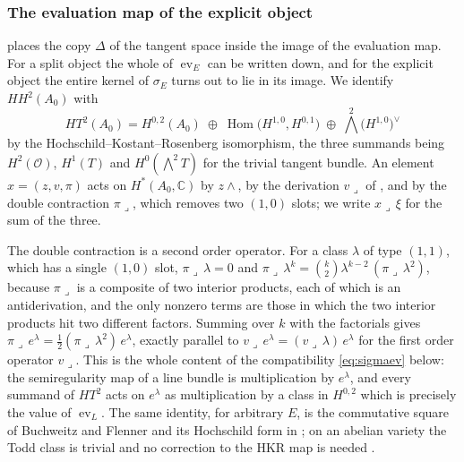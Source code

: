 \documentclass[11pt,reqno]{amsart}
\theoremstyle{plain}
\theoremstyle{definition}
\theoremstyle{remark}
\newcommand{\CC}{\mathbb{C}}
\newcommand{\cO}{\mathcal{O}}
\DeclareMathOperator{\Hom}{Hom}
\begin{document}
\subsubsection*{The evaluation map of the explicit object}

\cite[Theorem~9.19]{paperI} places the copy $\Delta$ of the tangent space inside the
image of the evaluation map. For a split object the whole of
$\operatorname{ev}_{E}$ can be written down, and for the explicit object the
entire kernel of $\sigma_{E}$ turns out to lie in its image. We identify
$HH^{2}(A_{0})$ with
\begin{equation}\label{eq:HT2}
  HT^{2}(A_{0})
  =H^{0,2}(A_{0})\;\oplus\;\Hom\bigl(H^{1,0},H^{0,1}\bigr)\;\oplus\;
   \textstyle\bigwedge^{2}\bigl(H^{1,0}\bigr)^{\vee}
\end{equation}
by the Hochschild--Kostant--Rosenberg isomorphism, the three summands being
$H^{2}(\cO)$, $H^{1}(T)$ and $H^{0}(\bigwedge^{2}T)$ for the trivial tangent
bundle. An element $x=(z,v,\pi)$ acts on $H^{*}(A_{0},\CC)$ by $z\wedge$, by
the derivation $v\lrcorner$ of \cite[Section~9.3]{paperI}, and by the double
contraction $\pi\lrcorner$, which removes two $(1,0)$ slots; we write
$x\lrcorner\,\xi$ for the sum of the three.

The double contraction is a second order operator. For a class $\lambda$ of
type $(1,1)$, which has a single $(1,0)$ slot, $\pi\lrcorner\,\lambda=0$ and
$\pi\lrcorner\,\lambda^{k}=\binom{k}{2}\lambda^{k-2}\,(\pi\lrcorner\,\lambda^{2})$,
because $\pi\lrcorner$ is a composite of two interior products, each of which
is an antiderivation, and the only nonzero terms are those in which the two
interior products hit two different factors. Summing over $k$ with the
factorials gives
$\pi\lrcorner\,e^{\lambda}=\tfrac12(\pi\lrcorner\,\lambda^{2})\,e^{\lambda}$,
exactly parallel to $v\lrcorner\,e^{\lambda}=(v\lrcorner\,\lambda)\,e^{\lambda}$
for the first order operator $v\lrcorner$. This is the whole content of the
compatibility \eqref{eq:sigmaev} below: the semiregularity map of a line
bundle is multiplication by $e^{\lambda}$, and every summand of $HT^{2}$ acts
on $e^{\lambda}$ as multiplication by a class in $H^{0,2}$ which is precisely
the value of $\operatorname{ev}_{L}$. The same identity, for arbitrary $E$, is
the commutative square of Buchweitz and Flenner \cite[Corollary 4.3]{BF03} and
its Hochschild form in \cite[Lemma 11.3]{Mar25b}; on an abelian variety the
Todd class is trivial and no correction to the HKR map is needed
\cite{Cal05,BF08}.
\end{document}
